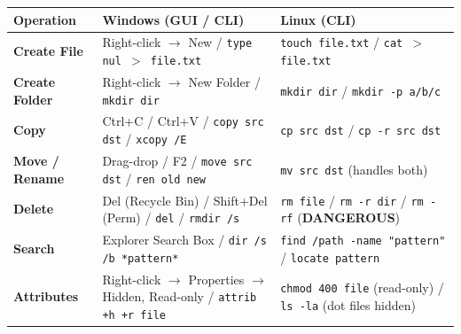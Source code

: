 \documentclass[11pt]{article}
\begin{document}
\begin{aretenir}
\begin{center}
\begin{tabularx}{\linewidth}{|l|X|X|}\hline
\rowcolor{popblueL}
\textbf{Operation} & \textbf{Windows (GUI / CLI)} & \textbf{Linux (CLI)} \\ \hline
\textbf{Create File} & Right-click $\rightarrow$ New / \texttt{type nul $>$ file.txt} & \texttt{touch file.txt} / \texttt{cat $>$ file.txt} \\ \hline
\textbf{Create Folder} & Right-click $\rightarrow$ New Folder / \texttt{mkdir dir} & \texttt{mkdir dir} / \texttt{mkdir -p a/b/c} \\ \hline
\textbf{Copy} & Ctrl+C / Ctrl+V / \texttt{copy src dst} / \texttt{xcopy /E} & \texttt{cp src dst} / \texttt{cp -r src dst} \\ \hline
\textbf{Move / Rename} & Drag-drop / F2 / \texttt{move src dst} / \texttt{ren old new} & \texttt{mv src dst} (handles both) \\ \hline
\textbf{Delete} & Del (Recycle Bin) / Shift+Del (Perm) / \texttt{del} / \texttt{rmdir /s} & \texttt{rm file} / \texttt{rm -r dir} / \texttt{rm -rf} (\textbf{DANGEROUS}) \\ \hline
\textbf{Search} & Explorer Search Box / \texttt{dir /s /b *pattern*} & \texttt{find /path -name "pattern"} / \texttt{locate pattern} \\ \hline
\textbf{Attributes} & Right-click $\rightarrow$ Properties $\rightarrow$ Hidden, Read-only / \texttt{attrib +h +r file} & \texttt{chmod 400 file} (read-only) / \texttt{ls -la} (dot files hidden) \\ \hline
\end{tabularx}
\end{center}
\end{aretenir}
\end{document}
